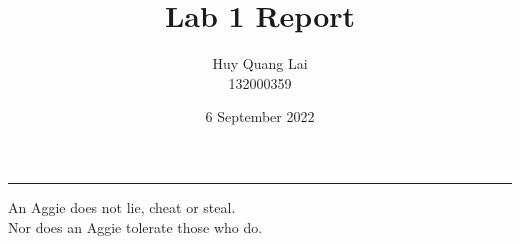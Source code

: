 \documentclass[fleqn,12pt]{article}
\title{\vspace{-2.5cm}Lab 1 Report}
\author{\vspace{-0.2cm} Huy Quang Lai\\132000359}
\affil{Texas A\&M University}
\date{\vspace{-0.5cm}6 September 2022}
\begin{document}
\maketitle
\begin{center}
\rule{\textwidth}{.1pt}
{\large
An Aggie does not lie, cheat or steal.\\
Nor does an Aggie tolerate those who do.
}
\end{center}







\noindent
\end{document}
